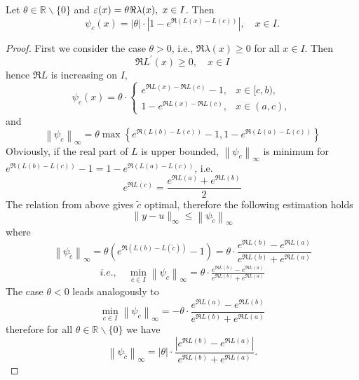 \documentclass[a4paper,12pt]{report}
\begin{document}
\begin{ex}
	 Let $\theta \in \mathbb{R} \backslash\{0\}$ and $\varepsilon(x)=\theta \Re \lambda(x), \hspace{0.1cm} x \in I$. Then
	$$
	\psi_{c}(x)=|\theta| \cdot\left|1-e^{\Re(L(x)-L(c))}\right|, \quad x \in I .
	$$
	\begin{proof}
	First we consider the case $\theta>0$, \hspace{0.1cm} i.e., $\Re \lambda(x) \ge 0$ for all $x \in I$. Then
	$$
	\Re L^{\prime}(x) \ge 0, \quad x \in I
	$$
	hence $\Re L$ is increasing on $I$,
	$$
	\psi_{c}(x)=\theta \cdot \begin{cases}e^{\Re L(x)-\Re L(c)}-1, & x \in[c, b), \\ 1-e^{\Re L(x)-\Re L(c)}, & x \in(a, c),\end{cases}
	$$
	and
	$$
	\left\|\psi_{c}\right\|_{\infty}=\theta \max \left\{e^{\Re(L(b)-L(c))}-1,1-e^{\Re(L(a)-L(c))}\right\}
	$$
	Obviously, if the real part of $L$ is upper bounded, $\left\|\psi_{c}\right\|_{\infty}$ is minimum for $e^{\Re(L(b)-L(c))}-1=1-e^{\Re(L(a)-L(c))}$, i.e.
	$$
	e^{\Re L(c)}=\frac{e^{\Re L(a)}+e^{\Re L(b)}}{2}
	$$
	The relation from above gives $\tilde{c}$ optimal, therefore the following \linebreak estimation holds
	$$
	\|y-u\|_{\infty} \le \left\|\psi_{\tilde{c}}\right\|_{\infty}
	$$
	where
	$$
	\left\|\psi_{\tilde{c}}\right\|_{\infty}=\theta\left(e^{\Re(L(b)-L(\tilde{c}))}-1\right)=\theta \cdot \frac{e^{\Re L(b)}-e^{\Re L(a)}}{e^{\Re L(b)}+e^{\Re L(a)}}
	$$
	\begin{eqnarray}
		i.e., \quad
		\min _{c \in I}\left\|\psi_{c}\right\|_{\infty}=\theta \cdot \frac{e^{\Re L(b)}-e^{\Re L(a)}}{e^{\Re L(b)}+e^{\Re L(a)}}
	\end{eqnarray}
The case $\theta<0$ leads analogously to
$$
\min _{c \in I}\left\|\psi_{c}\right\|_{\infty}=-\theta \cdot \frac{e^{\Re L(a)}-e^{\Re L(b)}}{e^{\Re L(b)}+e^{\Re L(a)}}
$$
therefore for all $\theta \in \mathbb{R} \backslash\{0\}$ we have
$$ \left\|\psi_{\tilde{c}}\right\|_{\infty}=|\theta| \cdot \frac{\left|e^{\Re L(b)}-e^{\Re L(a)}\right|}{e^{\Re L(b)}+e^{\Re L(a)}}. $$ 
	\end{proof}
\end{ex}
\end{document}
